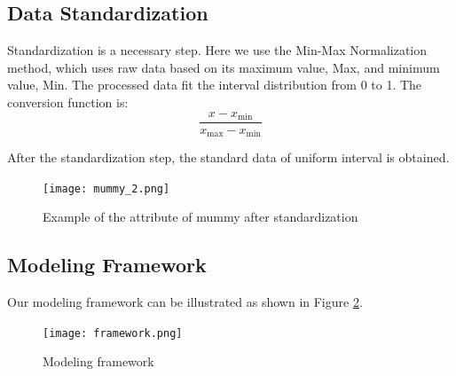 \documentclass[12pt]{article}  %
\begin{document}



\subsection{Data Standardization}
Standardization is a necessary step. Here we use the Min-Max Normalization method, which uses raw data based on its maximum value, Max, and minimum value, Min. The processed data fit the interval distribution from 0 to 1. The conversion function is:
\begin{equation}\label{eq:normal}
    \frac{x-x_{\min }}{x_{\max }-x_{\min }}
\end{equation}

After the standardization step, the standard data of uniform interval is obtained.
\begin{figure}[htbp]
    \centering
    \texttt{[image: mummy\_2.png]}
    \caption{Example of the attribute of mummy after standardization}\label{fig:mummy_2}
\end{figure}


\subsection{Modeling Framework}
Our modeling framework can be illustrated as shown in Figure \ref{fig:framework}.
\begin{figure}[htbp]
    \centering
    \texttt{[image: framework.png]}
    \caption{Modeling framework}\label{fig:framework}
\end{figure}
\end{document}
